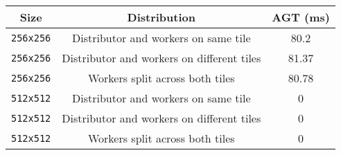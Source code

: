 {\small
\begin{tabular}{|c|c|c|}
    \hline Size & Distribution & AGT (ms) \\
    \hline \verb|256x256| & Distributor and workers on same tile & 80.2 \\
    \verb|256x256| & Distributor and workers on different tiles & 81.37 \\
    \verb|256x256| & Workers split across both tiles & 80.78 \\
    \hline \verb|512x512| & Distributor and workers on same tile & 0 \\
    \verb|512x512| & Distributor and workers on different tiles & 0 \\
    \verb|512x512| & Workers split across both tiles & 0 \\
    \hline
\end{tabular}}